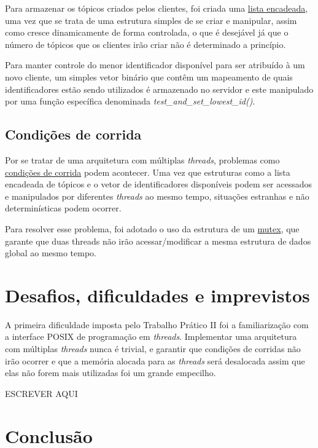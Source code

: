 \documentclass{article}
\begin{document}
Para armazenar os tópicos criados pelos clientes, foi criada uma
\href{https://en.wikipedia.org/wiki/Linked_list}{lista encadeada}, uma vez que
se trata de uma estrutura simples
de se criar e manipular, assim como cresce dinamicamente de forma controlada, o
que é desejável já que o número de tópicos que os clientes irão criar não é
determinado a princípio.

Para manter controle do menor identificador disponível para ser atribuído à um
novo cliente, um simples vetor binário que contêm um mapeamento de quais
identificadores estão sendo utilizados
é armazenado no servidor e este manipulado por uma função específica
denominada \textit{test\_and\_set\_lowest\_id()}.

\subsection{Condições de corrida}

Por se tratar de uma arquitetura com múltiplas \textit{threads}, problemas
como
\href{https://learn.microsoft.com/en-us/troubleshoot/developer/visualstudio/visual-basic/language-compilers/race-conditions-deadlocks}{condições
      de corrida}
podem acontecer. Uma vez que estruturas como a lista encadeada de tópicos e o
vetor de identificadores disponíveis
podem ser acessados e manipulados por diferentes \textit{threads} ao mesmo
tempo, situações estranhas e não determinísticas podem ocorrer.

Para resolver esse problema, foi adotado o uso da estrutura de um
\href{https://www.ibm.com/docs/pt-br/aix/7.3?topic=programming-using-mutexes}{mutex},
que garante que duas threads não irão acessar/modificar a mesma estrutura de
dados global
ao mesmo tempo.

\section{Desafios, dificuldades e imprevistos}

A primeira dificuldade imposta pelo Trabalho Prático II foi a familiarização
com a
interface POSIX de programação em \textit{threads}. Implementar uma arquitetura
com múltiplas \textit{threads}
nunca é trivial, e garantir que condições de corridas não irão ocorrer e que a
memória alocada para as \textit{threads} será desalocada assim que elas não
forem mais utilizadas foi um grande empecilho.

ESCREVER AQUI

\section{Conclusão}
\end{document}
